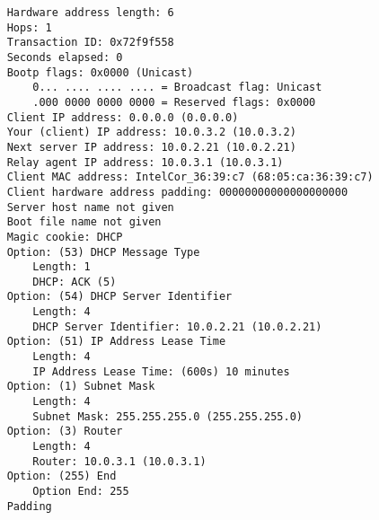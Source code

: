 \begin{lstlisting}
    Hardware address length: 6
    Hops: 1
    Transaction ID: 0x72f9f558
    Seconds elapsed: 0
    Bootp flags: 0x0000 (Unicast)
        0... .... .... .... = Broadcast flag: Unicast
        .000 0000 0000 0000 = Reserved flags: 0x0000
    Client IP address: 0.0.0.0 (0.0.0.0)
    Your (client) IP address: 10.0.3.2 (10.0.3.2)
    Next server IP address: 10.0.2.21 (10.0.2.21)
    Relay agent IP address: 10.0.3.1 (10.0.3.1)
    Client MAC address: IntelCor_36:39:c7 (68:05:ca:36:39:c7)
    Client hardware address padding: 00000000000000000000
    Server host name not given
    Boot file name not given
    Magic cookie: DHCP
    Option: (53) DHCP Message Type
        Length: 1
        DHCP: ACK (5)
    Option: (54) DHCP Server Identifier
        Length: 4
        DHCP Server Identifier: 10.0.2.21 (10.0.2.21)
    Option: (51) IP Address Lease Time
        Length: 4
        IP Address Lease Time: (600s) 10 minutes
    Option: (1) Subnet Mask
        Length: 4
        Subnet Mask: 255.255.255.0 (255.255.255.0)
    Option: (3) Router
        Length: 4
        Router: 10.0.3.1 (10.0.3.1)
    Option: (255) End
        Option End: 255
    Padding

\end{lstlisting}
